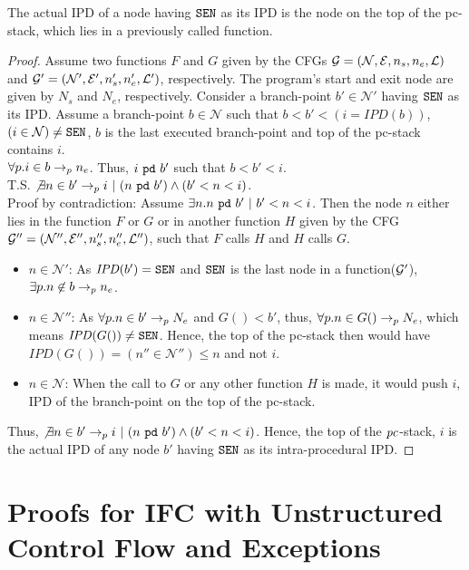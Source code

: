 \begin{myThm}\label{app:thm2:exc}
The actual IPD of a node having $\texttt{SEN}$ as its IPD is the node on
the top of the pc-stack, which lies in a previously called function.
\end{myThm}
\begin{proof}
Assume two functions $F$ and $G$ given by the CFGs $\mathcal{G} =
(\mathcal{N}, \mathcal{E}, n_s, n_e, \mathcal{L})$ and $\mathcal{G}' =
(\mathcal{N}', \mathcal{E}', n'_s, n'_e, \mathcal{L}')$,
respectively. The program's start and exit node are given by $N_s$ and
$N_e$, respectively. Consider a branch-point $b' \in \mathcal{N}'$ having
$\texttt{SEN}$ as its IPD. Assume a branch-point $b \in \mathcal{N}$ such
that $b < b' < (i = \mathit{IPD}(b))$, $(i \in \mathcal{N}) \neq
\texttt{SEN}$, $b$ is the last executed branch-point and 
 top of the pc-stack contains $i$. \\
$\forall p.i \in b \rightarrow_p n_e$. Thus, $i~\texttt{pd}~b'$
such that $b < b' < i$. \\
T.S. $\not\exists n \in b' \rightarrow_p i~|~(n~\texttt{pd}~b')
\wedge (b' < n < i)$. \\
Proof by contradiction:
Assume $\exists n.n~\texttt{pd}~b'~|~b' < n < i$. Then the node $n$ either lies in the
function $F$ or $G$ or in another function $H$ given by the CFG $\mathcal{G}'' =
(\mathcal{N}'', \mathcal{E}'', n''_s, n''_e, \mathcal{L}'')$, such
that $F$ calls $H$ and $H$ calls $G$.
\begin{itemize}
\item $n \in \mathcal{N}'$: As $\mathit{IPD}(b') = \texttt{SEN}$ and $\texttt{SEN}$ is
  the last node in a function($\mathcal{G}'$), $\exists p.n \not\in b \rightarrow_p n_e$. 
\item $n \in \mathcal{N}''$: As $\forall p. n \in b' \rightarrow_p N_e$ and
  $G() < b'$, thus, $\forall p. n \in G() \rightarrow_p N_e$,
  which means $\mathit{IPD}(G()) \neq \texttt{SEN}$. Hence, the top of the
  pc-stack then would have $\mathit{IPD}(G()) = (n'' \in
  \mathcal{N}'') \leq n$ and   not $i$.
\item $n \in \mathcal{N}$: When the call to $G$ or any other
  function $H$ is made, it would push $i$, IPD of the branch-point on
  the top of the  pc-stack.
\end{itemize}
Thus, $\not\exists n \in b' \rightarrow_p i~|~(n~\texttt{pd}~b')
\wedge (b' < n < i)$. Hence, the top of the $\mathit{pc}$-stack, $i$ is the
actual IPD of any node $b'$ having $\texttt{SEN}$ as its intra-procedural IPD. 
\end{proof}

\clearpage
\section{Proofs for IFC with Unstructured Control Flow and Exceptions}
\label{app:exc}

